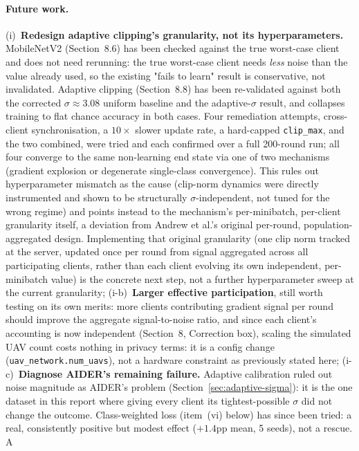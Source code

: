 \documentclass[12pt,a4paper]{article}
\begin{document}
\paragraph{Future work.}
(i)~\textbf{Redesign adaptive clipping's granularity, not its
hyperparameters.} MobileNetV2 (Section~8.6) has been checked against
the true worst-case client and does not need rerunning: the true
worst-case client needs \emph{less} noise than the value already used,
so the existing "fails to learn" result is conservative, not
invalidated. Adaptive clipping (Section~8.8) has been re-validated
against both the corrected $\sigma\approx3.08$ uniform baseline and the
adaptive-$\sigma$ result, and collapses training to flat chance
accuracy in both cases. Four remediation attempts, cross-client
synchronisation, a $10\times$ slower update rate, a hard-capped
\texttt{clip\_max}, and the two combined, were tried and each
confirmed over a full 200-round run; all four converge to the same
non-learning end state via one of two mechanisms (gradient explosion
or degenerate single-class convergence). This rules out hyperparameter
mismatch as the cause (clip-norm dynamics were directly instrumented
and shown to be structurally $\sigma$-independent, not tuned for the
wrong regime) and points instead to the mechanism's per-minibatch,
per-client granularity itself, a deviation from Andrew et al.'s
original per-round, population-aggregated design. Implementing that
original granularity (one clip norm tracked at the server, updated
once per round from signal aggregated across all participating
clients, rather than each client evolving its own independent,
per-minibatch value) is the concrete next step, not a further
hyperparameter sweep at the current granularity;
(i-b)~\textbf{Larger effective participation}, still worth testing on its
own merits: more clients contributing gradient signal per round should
improve the aggregate signal-to-noise ratio, and since each client's
accounting is now independent (Section~8, Correction box), scaling the
simulated UAV count costs nothing in privacy terms: it is a config
change (\texttt{uav\_network.num\_uavs}), not a hardware constraint as
previously stated here;
(i-c)~\textbf{Diagnose AIDER's remaining failure.} Adaptive calibration
ruled out noise magnitude as AIDER's problem (Section~\ref{sec:adaptive-sigma}):
it is the one dataset in this report where giving every client its
tightest-possible $\sigma$ did not change the outcome. Class-weighted
loss (item~(vi) below) has since been tried: a real, consistently
positive but modest effect ($+1.4$pp mean, 5 seeds), not a rescue. A
\end{document}
